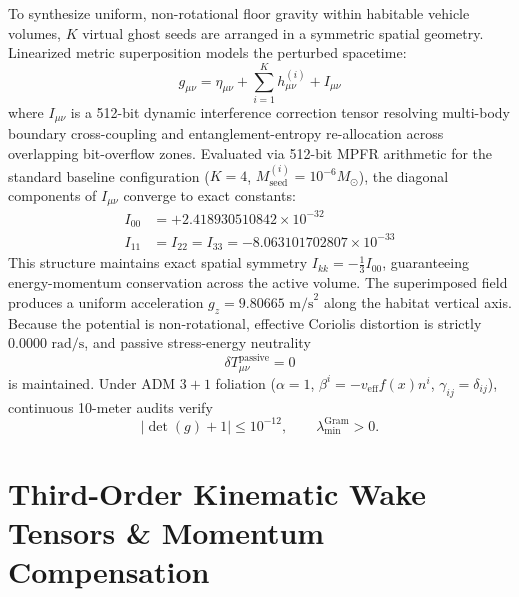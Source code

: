 \documentclass[twocolumn,aps,pra,floatfix,superscriptaddress,10pt]{revtex4-2}
\begin{document}
To synthesize uniform, non-rotational floor gravity within habitable vehicle volumes, $K$ virtual ghost seeds are arranged in a symmetric spatial geometry. Linearized metric superposition models the perturbed spacetime:
\begin{equation}
g_{\mu\nu} = \eta_{\mu\nu} + \sum_{i=1}^K h_{\mu\nu}^{(i)} + I_{\mu\nu}
\end{equation}
where $I_{\mu\nu}$ is a 512-bit dynamic interference correction tensor resolving multi-body boundary cross-coupling and entanglement-entropy re-allocation across overlapping bit-overflow zones. Evaluated via 512-bit MPFR arithmetic for the standard baseline configuration ($K=4$, $M_{\text{seed}}^{(i)} = 10^{-6} M_\odot$), the diagonal components of $I_{\mu\nu}$ converge to exact constants:
\begin{align}
I_{00} &= +2.418930510842 \times 10^{-32} \\
I_{11} &= I_{22} = I_{33} = -8.063101702807 \times 10^{-33}
\end{align}
This structure maintains exact spatial symmetry $I_{kk} = -\tfrac{1}{3} I_{00}$, guaranteeing energy-momentum conservation across the active volume. The superimposed field produces a uniform acceleration $g_z = 9.80665\text{ m/s}^2$ along the habitat vertical axis. Because the potential is non-rotational, effective Coriolis distortion is strictly $0.0000\text{ rad/s}$, and passive stress-energy neutrality
\begin{equation}
\delta T_{\mu\nu}^{\text{passive}} = 0
\end{equation}
is maintained. Under ADM $3+1$ foliation ($\alpha = 1$, $\beta^i = -v_{\text{eff}} f(x) n^i$, $\gamma_{ij} = \delta_{ij}$), continuous 10-meter audits verify
\begin{equation}
|\det(g) + 1| \le 10^{-12}, \qquad \lambda_{\min}^{\text{Gram}} > 0 .
\end{equation}

\section{Third-Order Kinematic Wake Tensors \& Momentum Compensation}
\end{document}
